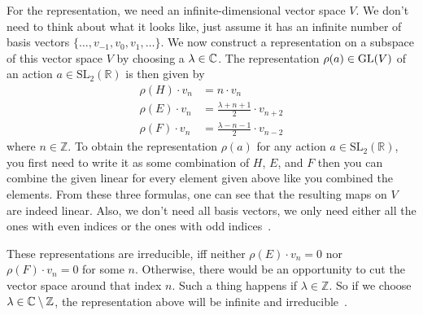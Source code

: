 For the representation, we need an infinite-dimensional vector space $V$.
We don't need to think about what it looks like, just assume it has an infinite number of basis vectors $\{\ldots, v_{-1}, v_0, v_1, \ldots\}$.
We now construct a representation on a subspace of this vector space $V$ by choosing a $\lambda \in \mathbb{C}$.
The representation $\rho(a) \in \operatorname{GL}(V)$ of an action $a \in \text{SL}_2(\mathbb{R})$ is then given by
\begin{subequations}
    \begin{align}
        \rho(H) \cdot v_n & = n \cdot v_n \\
        \rho(E) \cdot v_n & = \frac{\lambda + n + 1}{2} \cdot v_{n + 2} \\
        \rho(F) \cdot v_n & = \frac{\lambda - n - 1}{2} \cdot v_{n - 2}
    \end{align}
\end{subequations}
where $n \in \mathbb{Z}$.
To obtain the representation $\rho(a)$ for any action $a \in \text{SL}_2(\mathbb{R})$, you first need to write it as some combination of $H$, $E$, and $F$ then you can combine the given linear for every element given above like you combined the elements.
From these three formulas, one can see that the resulting maps on $V$ are indeed linear.
Also, we don't need all basis vectors, we only need either all the ones with even indices or the ones with odd indices~\cite{borcherds2011}.

These representations are irreducible, iff neither $\rho(E) \cdot v_n = 0$ nor $\rho(F) \cdot v_n = 0$ for some $n$.
Otherwise, there would be an opportunity to cut the vector space around that index $n$.
Such a thing happens if $\lambda \in \mathbb{Z}$.
So if we choose $\lambda \in \mathbb{C} \setminus \mathbb{Z}$, the representation above will be infinite and irreducible~\cite{borcherds2011}.
